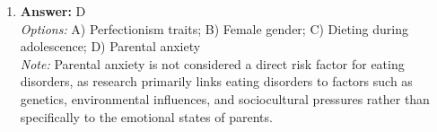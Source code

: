 \documentclass[12pt]{article}
\begin{document}
\begin{enumerate}[label=\arabic*.]
\\ \textit{Note:} The correct answer is that all of the options given are correct because food balance sheets often have limitations such as incomplete data, potential inaccuracies in reporting, and failure to account for food waste, which collectively hinder their effectiveness in providing a comprehensive view of food availability and consumption.
\item \textbf{Answer:} D
\\ \textit{Options:} A) Perfectionism traits; B) Female gender; C) Dieting during adolescence; D) Parental anxiety
\\ \textit{Note:} Parental anxiety is not considered a direct risk factor for eating disorders, as research primarily links eating disorders to factors such as genetics, environmental influences, and sociocultural pressures rather than specifically to the emotional states of parents.
\end{enumerate}
\end{document}
